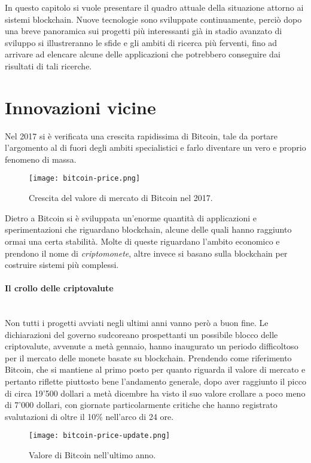 In questo capitolo si vuole presentare il quadro attuale della situazione attorno ai sistemi blockchain. Nuove tecnologie sono sviluppate continuamente, perciò dopo una breve panoramica sui progetti più interessanti già in stadio avanzato di sviluppo si illustreranno le sfide e gli ambiti di ricerca più ferventi, fino ad arrivare ad elencare alcune delle applicazioni che potrebbero conseguire dai risultati di tali ricerche.

\section{Innovazioni vicine}
    Nel 2017 si è verificata una crescita rapidissima di Bitcoin, tale da portare l'argomento al di fuori degli ambiti specialistici e farlo diventare un vero e proprio fenomeno di massa.
    \begin{figure}[ht]
        \centering
        \texttt{[image: bitcoin-price.png]}
        \caption[Valore di mercato di Bitcoin nel 2017]{Crescita del valore di mercato di Bitcoin nel 2017.}
        \label{fig:bitcoin_price}
    \end{figure}
    Dietro a Bitcoin si è sviluppata un'enorme quantità di applicazioni e sperimentazioni che riguardano blockchain, alcune delle quali hanno raggiunto ormai una certa stabilità. Molte di queste riguardano l'ambito economico e prendono il nome di \emph{criptomonete}, altre invece si basano sulla blockchain per costruire sistemi più complessi.

    \paragraph{Il crollo delle criptovalute} ~ \\
    Non tutti i progetti avviati negli ultimi anni vanno però a buon fine.
    Le dichiarazioni del governo sudcoreano prospettanti un possibile blocco delle criptovalute, avvenute a metà gennaio, hanno inaugurato un periodo difficoltoso per il mercato delle monete basate su blockchain. Prendendo come riferimento Bitcoin, che si mantiene al primo posto per quanto riguarda il valore di mercato e pertanto riflette piuttosto bene l'andamento generale, dopo aver raggiunto il picco di circa 19'500 dollari a metà dicembre ha visto il suo valore crollare a poco meno di 7'000 dollari, con giornate particolarmente critiche che hanno registrato svalutazioni di oltre il 10\% nell'arco di 24 ore.

        \begin{figure}[ht]
            \centering
            \texttt{[image: bitcoin-price-update.png]}
            \caption[Valore di Bitcoin nell'ultimo anno]{Valore di Bitcoin nell'ultimo anno.}
            \label{fig:bitcoin-price-update}
        \end{figure}


